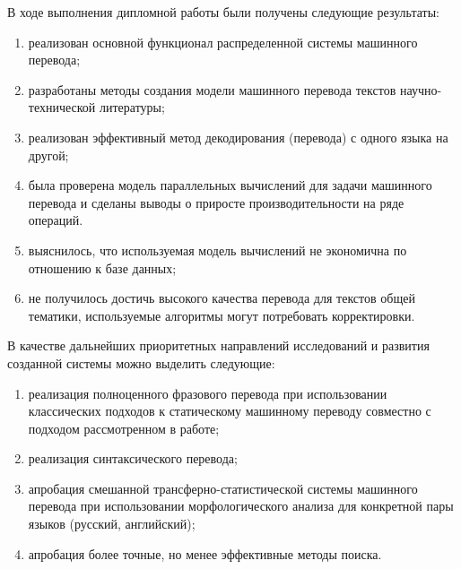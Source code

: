 

В ходе выполнения дипломной работы были получены следующие результаты:

{\renewcommand{\labelenumi}{\alph{enumi})}
	\begin{enumerate}
		\item реализован основной функционал распределенной системы машинного перевода;
		\item разработаны методы создания модели машинного перевода текстов научно-технической литературы;
		\item реализован эффективный метод декодирования (перевода) с одного языка на другой;
		\item была проверена модель параллельных вычислений для задачи машинного перевода
			и сделаны выводы о приросте производительности на ряде операций. 
		\item выяснилось, что используемая модель вычислений не экономична 
			по отношению к базе данных;
		\item не получилось достичь высокого качества перевода для текстов общей тематики, 
			используемые алгоритмы могут потребовать корректировки.
	\end{enumerate}
}
В качестве дальнейших приоритетных направлений исследований 
и развития созданной системы можно выделить следующие:
{\renewcommand{\labelenumi}{\alph{enumi})}
	\begin{enumerate}
		\item реализация полноценного фразового перевода
			при использовании классических подходов 
				к статическому машинному переводу совместно с подходом рассмотренном в работе;
		\item реализация синтаксического перевода;
		\item апробация смешанной трансферно-статистической системы машинного перевода 
			при использовании морфологического анализа для конкретной пары языков (русский, английский);
		\item апробация более точные, но менее эффективные методы поиска.
	\end{enumerate}
}
